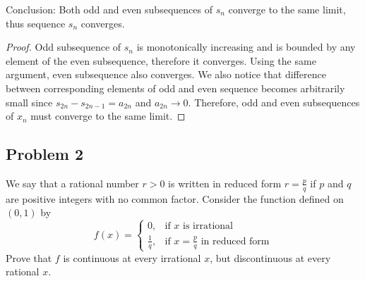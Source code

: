 \documentclass{article}
\begin{document}
Conclusion: Both odd and even subsequences of $s_n$ converge to the same limit, thus sequence $s_n$ converges.

\begin{proof}

Odd subsequence of $s_n$ is monotonically increasing and is bounded by any element of the even subsequence, therefore it converges.
Using the same argument, even subsequence also converges.
We also notice that difference between corresponding elements of odd and even sequence becomes arbitrarily small since $s_{2n} - s_{2n-1} = a_{2n}$ and $a_{2n} \to 0$.
Therefore, odd and even subsequences of $x_n$ must converge to the same limit.

\end{proof}


\subsection*{Problem 2}

\begin{tcolorbox}
We say that a rational number $r > 0$ is written in reduced form $r = \frac{p}{q}$ if $p$ and $q$ are positive integers with no common factor.
Consider the function defined on $(0, 1)$ by
\[
    f(x) =
    \begin{cases}
        0, & \text{if $x$ is irrational}\\
        \frac{1}{q}, & \text{if $x=\frac{p}{q}$ in reduced form}
    \end{cases}
\]
Prove that $f$ is continuous at every irrational $x$, but discontinuous at every rational $x$.
\end{tcolorbox}
\end{document}
